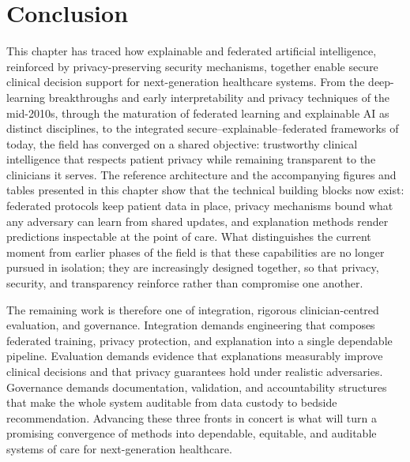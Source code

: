 \documentclass[11pt,a4paper]{article}
\begin{document}
\section{Conclusion}
This chapter has traced how explainable and federated artificial intelligence,
reinforced by privacy-preserving security mechanisms, together enable secure
clinical decision support for next-generation healthcare systems. From the
deep-learning breakthroughs and early interpretability and privacy techniques of
the mid-2010s, through the maturation of federated learning and explainable AI as
distinct disciplines, to the integrated secure--explainable--federated frameworks
of today, the field has converged on a shared objective: trustworthy clinical
intelligence that respects patient privacy while remaining transparent to the
clinicians it serves. The reference architecture and the accompanying figures and
tables presented in this chapter show that the technical building blocks now
exist: federated protocols keep patient data in place, privacy mechanisms bound
what any adversary can learn from shared updates, and explanation methods render
predictions inspectable at the point of care. What distinguishes the current
moment from earlier phases of the field is that these capabilities are no longer
pursued in isolation; they are increasingly designed together, so that privacy,
security, and transparency reinforce rather than compromise one another.

The remaining work is therefore one of integration, rigorous clinician-centred
evaluation, and governance. Integration demands engineering that composes
federated training, privacy protection, and explanation into a single dependable
pipeline. Evaluation demands evidence that explanations measurably improve
clinical decisions and that privacy guarantees hold under realistic adversaries.
Governance demands documentation, validation, and accountability structures that
make the whole system auditable from data custody to bedside recommendation.
Advancing these three fronts in concert is what will turn a promising convergence
of methods into dependable, equitable, and auditable systems of care for
next-generation healthcare.
\end{document}
